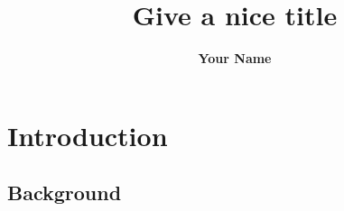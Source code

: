 \documentclass[12pt]{article}
\title{\textbf{Give a nice title}}
\author{\textbf{Your Name}}
\numberwithin{equation}{section}
\begin{document}
\maketitle
\tableofcontents

\section{Introduction}
\subsection{Background}
\end{document}
